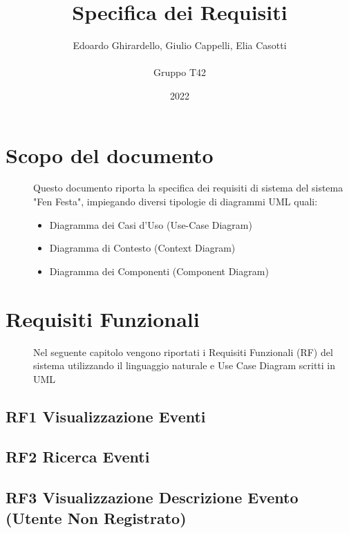\documentclass{article}
\title{\textbf{\Huge Specifica dei Requisiti}}
\author{Edoardo Ghirardello, Giulio Cappelli, Elia Casotti \\ \\ Gruppo T42}
\date{2022}
\begin{document}
\maketitle

\clearpage
\tableofcontents
\clearpage

\section{Scopo del documento}
\begin{description}
    \item[] Questo documento riporta la specifica dei requisiti di sistema del sistema "Fen Festa", impiegando diversi tipologie di diagrammi UML quali:
        \begin{itemize}
            \item Diagramma dei Casi d'Uso (Use-Case Diagram)
            \item Diagramma di Contesto (Context Diagram)
            \item Diagramma dei Componenti (Component Diagram)
        \end{itemize}
\end{description}
\clearpage
\section{Requisiti Funzionali}
\begin{description}
    \item[] Nel seguente capitolo vengono riportati i Requisiti Funzionali (RF) del sistema utilizzando il linguaggio naturale e Use Case Diagram scritti in UML
\end{description}
\renewcommand\thesubsection{}
\subsection{RF1 Visualizzazione Eventi}
\subsection{RF2 Ricerca Eventi}
\subsection{RF3 Visualizzazione Descrizione Evento (Utente Non Registrato)}
\end{document}
